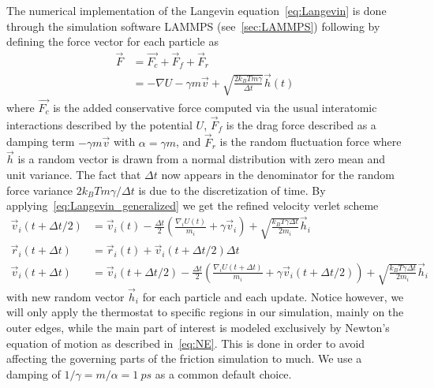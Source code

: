 The numerical implementation of the Langevin equation~\cref{eq:Langevin} is done through the simulation software LAMMPS (see~\cref{sec:LAMMPS}) following
\cite{PhysRevB.17.1302} by defining the force vector for each particle as 
\begin{align}
  \vec{F} &= \vec{F_c} + \vec{F}_{f} + \vec{F}_{r} \nonumber \\
  &= -\nabla U - \gamma m \vec{v} + \sqrt{\frac{2 k_B T m \gamma}{\Delta t}}\vec{h}(t)
  \label{eq:Langevin_generalized}
\end{align}
where $\vec{F_c}$ is the added conservative force computed via the usual
interatomic interactions described by the potential $U$, $\vec{F}_f$ is the
drag force described as a damping term $-\gamma m \vec{v}$ with $\alpha = \gamma m$, and $\vec{F}_r$ is the random fluctuation force where $\vec{h}$ is a
random vector is drawn from a normal distribution with zero mean and unit variance. The fact that $\Delta t$ now appears in the denominator for the random force variance $2k_B T m \gamma / \Delta t$ is due to the discretization of time. By applying~\cref{eq:Langevin_generalized} we get the refined velocity verlet scheme
\begin{align*}
  \vec{v}_i(t + \Delta t/2)  &= \vec{v}_i(t) - \frac{\Delta t}{2}\left(\frac{\nabla_i U(t)}{m_i} + \gamma \vec{v}_i \right) + \sqrt{\frac{k_B T \gamma \Delta t}{2m_i}} \vec{h}_i \\ 
  \vec{r}_i(t + \Delta t) &= \vec{r}_i(t) + \vec{v}_i(t + \Delta t/2) \Delta t \\
  \vec{v}_i(t + \Delta t) &= \vec{v}_i(t+ \Delta t/2) - \frac{\Delta t}{2}\left(\frac{\nabla_i U(t + \Delta t)}{m_i} + \gamma \vec{v}_i(t + \Delta t/2) \right) + \sqrt{\frac{k_B T \gamma \Delta t}{2m_i}} \vec{h}_i
\end{align*}
with new random vector $\vec{h}_i$ for each particle and each update. Notice
however, we will only apply the thermostat to specific regions in our simulation, mainly on the outer edges, while the main part of interest is modeled exclusively by Newton's equation of motion as described in~\cref{eq:NE}. This is done in order to avoid affecting the governing parts of the friction simulation to much. We use a damping of $1/\gamma = m/\alpha = \SI{1}{ps}$ as a common default choice. 





